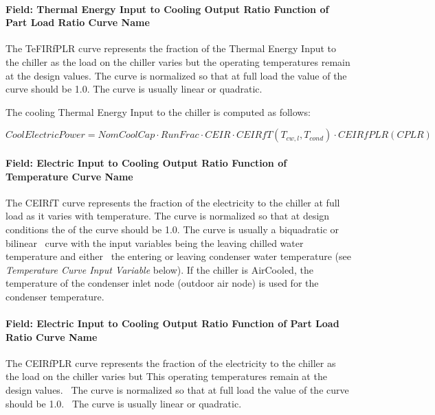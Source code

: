 \paragraph{Field: Thermal Energy Input to Cooling Output Ratio Function of Part Load Ratio Curve Name}\label{field-thermal-energy-input-to-cooling-output-ratio-function-of-part-load-ratio-curve-name}

The TeFIRfPLR curve represents the fraction of the Thermal Energy Input to the chiller as the load on the chiller varies but the operating temperatures remain at the design values. The curve is normalized so that at full load the value of the curve should be 1.0. The curve is usually linear or quadratic.

The cooling Thermal Energy Input to the chiller is computed as follows:

\begin{equation}
CoolElectricPower = NomCoolCap \cdot RunFrac \cdot CEIR \cdot CEIRfT\left( {{T_{cw,l}},{T_{cond}}} \right) \cdot CEIRfPLR(CPLR)
\end{equation}

\paragraph{Field: Electric Input to Cooling Output Ratio Function of Temperature Curve Name}\label{field-electric-input-to-cooling-output-ratio-function-of-temperature-curve-name-3}

The CEIRfT curve represents the fraction of the electricity to the chiller at full load as it varies with temperature. The curve is normalized so that at design conditions the of the curve should be 1.0. The curve is usually a biquadratic or bilinear~ curve with the input variables being the leaving chilled water temperature and either~ the entering or leaving condenser water temperature (see \emph{Temperature Curve Input Variable} below). If the chiller is AirCooled, the temperature of the condenser inlet node (outdoor air node) is used for the condenser temperature.

\paragraph{Field: Electric Input to Cooling Output Ratio Function of Part Load Ratio Curve Name}\label{field-electric-input-to-cooling-output-ratio-function-of-part-load-ratio-curve-name-3}

The CEIRfPLR curve represents the fraction of the electricity to the chiller as the load on the chiller varies but This operating temperatures remain at the design values.~ The curve is normalized so that at full load the value of the curve should be 1.0.~ The curve is usually linear or quadratic.

